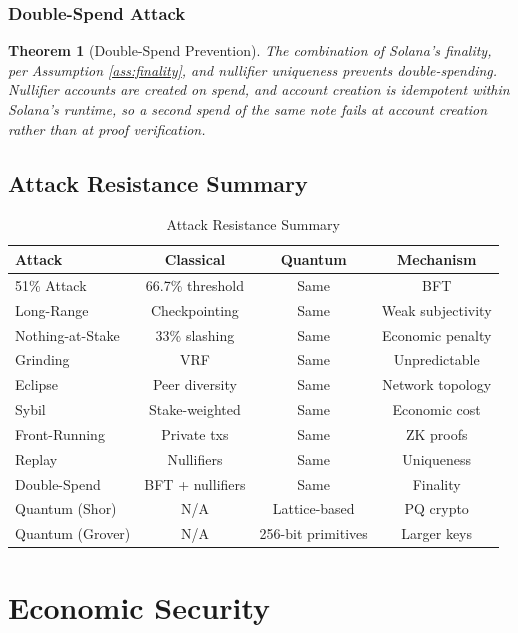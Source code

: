 \documentclass[11pt,a4paper]{article}
\newtheorem{theorem}{Theorem}[section]
\begin{document}
\subsubsection{Double-Spend Attack}

\begin{theorem}[Double-Spend Prevention]
The combination of Solana's finality, per Assumption \ref{ass:finality}, and nullifier uniqueness prevents double-spending. Nullifier accounts are created on spend, and account creation is idempotent within Solana's runtime, so a second spend of the same note fails at account creation rather than at proof verification.
\end{theorem}

\subsection{Attack Resistance Summary}

\begin{table}[h]
\centering
\caption{Attack Resistance Summary}
\begin{tabular}{@{}lccc@{}}
\toprule
\textbf{Attack} & \textbf{Classical} & \textbf{Quantum} & \textbf{Mechanism} \\ \midrule
51\% Attack & 66.7\% threshold & Same & BFT \\
Long-Range & Checkpointing & Same & Weak subjectivity \\
Nothing-at-Stake & 33\% slashing & Same & Economic penalty \\
Grinding & VRF & Same & Unpredictable \\
Eclipse & Peer diversity & Same & Network topology \\
Sybil & Stake-weighted & Same & Economic cost \\
Front-Running & Private txs & Same & ZK proofs \\
Replay & Nullifiers & Same & Uniqueness \\
Double-Spend & BFT + nullifiers & Same & Finality \\
Quantum (Shor) & N/A & Lattice-based & PQ crypto \\
Quantum (Grover) & N/A & 256-bit primitives & Larger keys \\ \bottomrule
\end{tabular}
\end{table}

\section{Economic Security}
\end{document}
